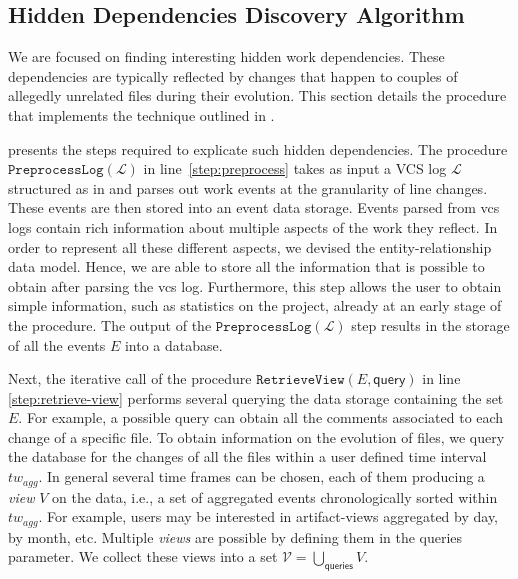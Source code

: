 \subsection{Hidden Dependencies Discovery Algorithm}

We are focused on finding interesting hidden work dependencies. These dependencies are typically reflected by changes that happen to couples of allegedly unrelated files during their evolution. This section details the procedure that implements the technique outlined in .

 presents the steps required to explicate such hidden dependencies. The procedure $\mathtt{PreprocessLog(\mathcal{L})}$ in line~\ref{step:preprocess} takes as input a VCS log $\mathcal{L}$ structured as in  and parses out work events at the granularity of line changes. These events are then stored into an event data storage. Events parsed from \gls{vcs} logs contain rich information about multiple aspects of the work they reflect. In order to represent all these different aspects, we devised the entity-relationship data model. Hence, we are able to store all the information that is possible to obtain after parsing the \gls{vcs} log. Furthermore, this step allows the user to obtain simple information, such as statistics on the project, already at an early stage of the procedure. The output of the $\mathtt{PreprocessLog(\mathcal{L})}$ step results in the storage of all the events $E$ into a database.



Next, the iterative call of the procedure $\mathtt{RetrieveView(\mathit{E}, \mathsf{query})}$ in line \ref{step:retrieve-view} performs several querying the data storage containing the set $E$. For example, a possible query can obtain all the comments associated to each change of a specific file. To obtain information on the evolution of files, we query the database for the changes of all the files within a user defined time interval $tw_{agg}$. In general several time frames can be chosen, each of them producing a \emph{view} $V$ on the data, i.e., a set of aggregated events chronologically sorted within $tw_{agg}$. For example, users may be interested in artifact-views aggregated by day, by month, etc. Multiple \emph{views} are possible by defining them in the {\textsf{queries}} parameter. We collect these views into a set $\mathcal{V} = \bigcup_{\textsf{queries}} V$. 

